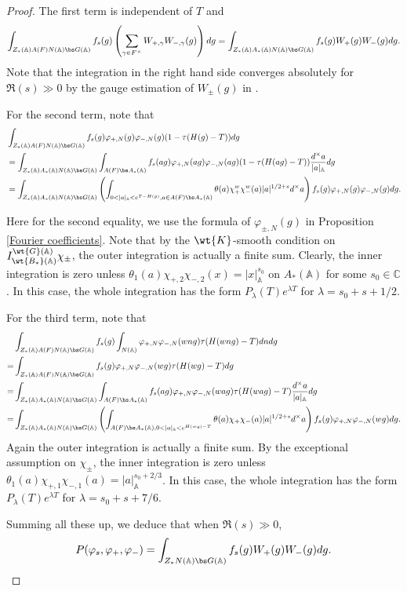 \documentclass[11pt,reqno]{amsart}
\newcommand{\BA}{{\mathbb {A}}} \newcommand{\BB}{{\mathbb {B}}}
\newcommand{\BC}{{\mathbb {C}}} \newcommand{\BD}{{\mathbb {D}}}
\theoremstyle{plain}
\theoremstyle{remark} \newtheorem{remark}[thm]{Remark}
\theoremstyle{definition} \newtheorem{exercise}[thm]{Exercise}
\theoremstyle{definition} \newtheorem{example}[thm]{Example} \newtheorem{condition}[thm]{Condition}
\numberwithin{equation}{section}
\renewcommand{\-}{\text{--}}
\begin{document}
\begin{proof}
The first term is independent of $T$ and 
\[\int_{Z_*(\BA)A(F)N(\BA)\bs G(\BA)}f_s(g)\left(\sum_{\gamma\in F^\times}W_{+,\gamma}W_{-,\gamma}(g)\right) dg=\int_{Z_*(\BA)A_*(\BA)N(\BA)\bs G(\BA)}f_s(g)W_+(g)W_-(g)dg.\]
Note that the integration in the right hand side  converges absolutely for $\Re(s)\gg0$ by the gauge estimation of $W_{\pm}(g)$ in \cite[Theorem I.4.1]{KP84}.

For the second term, note that
\begin{align*}
&\int_{Z_*(\BA)A(F)N(\BA)\bs G(\BA)}f_s(g)\varphi_{+,N}(g)\varphi_{-,N}(g)(1-\tau(H(g)-T)) dg\\
&=\int_{Z_*(\BA)A_*(\BA)N(\BA)\bs G(\BA)}\int_{A(F)\bs A_*(\BA)}f_s(ag)\varphi_{+,N}(ag)\varphi_{-,N}(ag)(1-\tau(H(ag)-T))\frac{d^\times a}{|a|_\BA}dg\\
&=\int_{Z_*(\BA)A_*(\BA)N(\BA)\bs G(\BA)}\left(\int_{ 0<|a|_\BA<e^{T-H(g)}, a\in A(F)\bs A_*(\BA)}\theta(a)\chi_+^w\chi_-^w(a)|a|^{1/2+s}d^\times a\right)f_s(g)\varphi_{+,N}(g)\varphi_{-,N}(g)dg.
\end{align*}

Here for the second equality, we use the formula of $\varphi_{\pm,N}(g)$ in Proposition \ref{Fourier coefficients}. Note that by the $\wt{K}$-smooth condition on $I_{\wt{B_*}(\BA)}^{\wt{G}(\BA)}\chi_{\pm}$, the outer integration is actually a finite sum.
Clearly, the inner integration is zero unless $\theta_1(a)\chi_{+,2}\chi_{-,2}(x)=|x|_\BA^{s_0}$ on $A_*(\BA)$ for some $s_0\in\BC$. In this case,   the whole integration has the form $P_{\lambda}(T)e^{\lambda T}$ for $\lambda=s_0+s+1/2$. 


For the third term, note that \begin{align*}&\int_{Z_*(\BA)A(F)N(\BA)\bs G(\BA)}f_s(g)\int_{N(\BA)}\varphi_{+,N}\varphi_{-,N}(wng)\tau(H(wng)-T)dndg\\
=&\int_{Z_*(\BA)A(F)N(\BA)\bs G(\BA)}f_s(g)\varphi_{+,N}\varphi_{-,N}(wg)\tau(H(wg)-T)dg\\
=&\int_{Z_*(\BA)A_*(\BA)N(\BA)\bs G(\BA)}\int_{A(F)\bs A_*(\BA)}f_s(ag)\varphi_{+,N}\varphi_{-,N}(wag)\tau(H(wag)-T)\frac{d^\times a}{|a|_\BA}dg\\
=&\int_{Z_*(\BA)A_*(\BA)N(\BA)\bs G(\BA)}\left(\int_{A(F)\bs A_*(\BA), 0<|a|_\BA<e^{H(wg)-T}}\theta(a)\chi_+\chi_-(a)|a|^{1/2+s}d^\times a\right)f_s(g)\varphi_{+,N}\varphi_{-,N}(wg)dg.
\end{align*}
Again the outer integration is actually a finite sum. By the exceptional assumption on $\chi_{\pm}$, the inner integration is zero unless $\theta_1(a)\chi_{+,1}\chi_{-,1}(a)=|a|_\BA^{s_0+2/3}$. In this case, the whole integration has the form $P_{\lambda}(T)e^{\lambda T}$ for $\lambda=s_0+s+7/6$. 
 
Summing all these up, we deduce that when $\Re(s)\gg0$, 
\begin{align*}P(\varphi_s,\varphi_+,\varphi_-)=\int_{Z_*N(\BA)\bs G(\BA)}f_s(g)W_+(g)W_-(g)dg.
\end{align*}
\end{proof}
\end{document}
